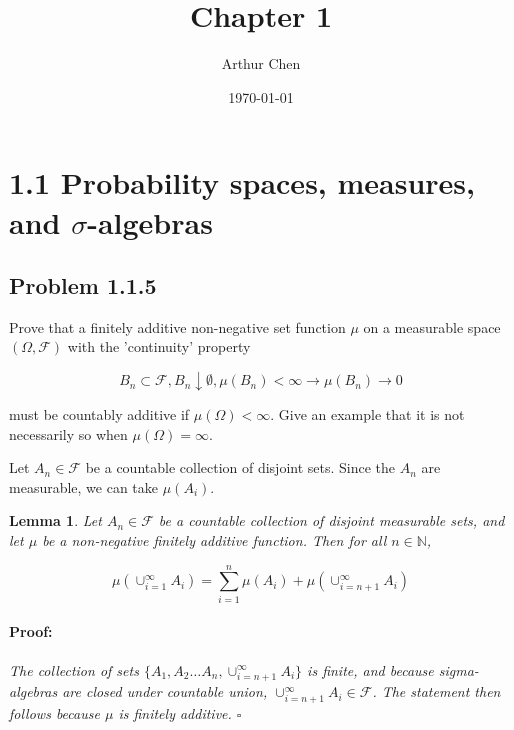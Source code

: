 \documentclass{article}
\author{Arthur Chen}
\title{Chapter 1}
\date{\today}
\newenvironment{proof}{\paragraph{Proof:}}{\hfill$\square$}
\newtheorem{lemma}[theorem]{Lemma}
\newcommand{\F}{\mathcal{F}}
\newcommand{\N}{\mathbb{N}}
\begin{document}
\maketitle

\section*{1.1 Probability spaces, measures, and $\sigma$-algebras}

\subsection*{Problem 1.1.5}

Prove that a finitely additive non-negative set function $\mu$ on a measurable space $(\Omega, \F)$ with the 'continuity' property

\[
B_n \subset \F, B_n \downarrow \emptyset, \mu(B_n) < \infty \longrightarrow \mu(B_n) \rightarrow 0
\]

must be countably additive if $\mu(\Omega) < \infty$. Give an example that it is not necessarily so when $\mu(\Omega) = \infty$.

Let $A_n \in \F$ be a countable collection of disjoint sets. Since the $A_n$ are measurable, we can take $\mu(A_i)$.

\begin{lemma}
Let $A_n \in \F$ be a countable collection of disjoint measurable sets, and let $\mu$ be a non-negative finitely additive function. Then for all $n \in \N$,

\[
\mu(\cup_{i=1}^\infty A_i) = \sum_{i=1}^n \mu(A_i) + \mu(\cup_{i=n+1}^\infty A_i)
\]
\begin{proof}
The collection of sets $\{A_1, A_2 \dots A_n, \cup_{i=n+1}^\infty A_i\}$ is finite, and because sigma-algebras are closed under countable union, $\cup_{i=n+1}^\infty A_i \in \F$. The statement then follows because $\mu$ is finitely additive.
\end{proof}
\end{lemma}
\end{document}

